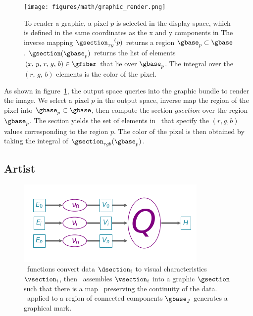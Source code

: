 \documentclass[../main.tex]{subfiles}
\begin{document}
\begin{figure}
    \texttt{[image: figures/math/graphic\_render.png]}
    \caption{To render a graphic, a pixel $p$ is selected in the display space, which is defined in the same coordinates as the x and y components in \gfiber\.  The inverse mapping ${\gsection_{xy}}^(p)$ returns a region $\gbase_{p} \subset \gbase$. $\gsection(\gbase_{p})$ returns the list of elements $(x,\,y,\,r,\,g,\,b) \in \gfiber$ that lie over $\gbase_{p}$. The integral over the $(r,\,g,\,b)$ elements is the color of the pixel.}
    \label{fig:graphic_rho_lookup}
\end{figure}
As shown in figure~\ref{fig:graphic_rho_lookup}, the output space queries into the graphic bundle to render the image. We select a pixel $p$ in the output space, inverse map the region of the pixel into $\gbase_p \subset \gbase$, then compute the section $gsection$ over the region $\gbase_p$. The section yields the set of elements in \gfiber\ that specify the $(r, g, b)$ values corresponding to the region $p$. The color of the pixel is then obtained by taking the integral of $\gsection_{rgb}(\gbase_p)$. 

\subsection{Artist}
\label{sec:artist}
\begin{figure}[H]
    \includegraphics[width=\textwidth]{figures/math/path_of_q}
    \caption{\vchannel\ functions convert data $\dsection_i$ to visual characteristics $\vsection_i$, then \vmark\ assembles $\vsection_i$ into a graphic $\gsection$ such that there is a map \vindex\ preserving the continuity of the data. \gsection\ applied to a region of connected components $\gbase_J$ generates a graphical mark.} 
    \label{fig:artist_q}
\end{figure}
\end{document}
